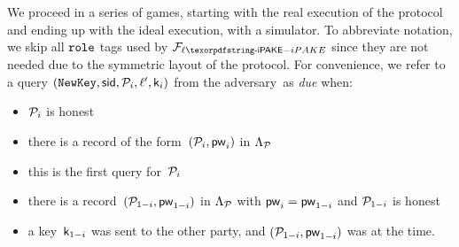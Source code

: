 We proceed in a series of games, starting with the real execution of the protocol and ending up with the ideal execution, with a simulator. To abbreviate notation, we skip all $\texttt{role}$ tags used by $\FliPAKE$ since they are not needed due to the symmetric layout of the protocol.
For convenience, we refer to a query $(\texttt{NewKey},\mathsf{sid},\mathcal{P}_{i},\ell',\mathsf{k}_{i})$ from the adversary~\Sim as \emph{due} when:
\begin{itemize}
	\item $\mathcal{P}_{i}$ is honest
	\item there is a  record of the form~$(\mathcal{P}_{i},\mathsf{pw}_{i})$ in $\Lambda_{\mathcal{P}}$
	\item this is the first \NewKey query for~$\mathcal{P}_{i}$
	\item there is a record~$(\mathcal{P}_{1-i},\mathsf{pw}_{1-i})$ in $\Lambda_{\mathcal{P}}$ with $\mathsf{pw}_{i}=\mathsf{pw}_{1-i}$ and $\mathcal{P}_{1-i}$ is honest
	\item a key~$\mathsf{k}_{1-i}$ was sent to the other party, and $(\mathcal{P}_{1-i},\mathsf{pw}_{1-i})$ was  at the time.
\end{itemize}

